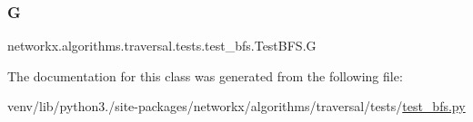 \subsubsection{\texorpdfstring{G}{G}}
{\footnotesize\ttfamily networkx.\+algorithms.\+traversal.\+tests.\+test\+\_\+bfs.\+Test\+B\+F\+S.\+G}



The documentation for this class was generated from the following file\+:\begin{DoxyCompactItemize}
\item 
venv/lib/python3./site-\/packages/networkx/algorithms/traversal/tests/\hyperlink{test__bfs_8py}{test\+\_\+bfs.\+py}\end{DoxyCompactItemize}
